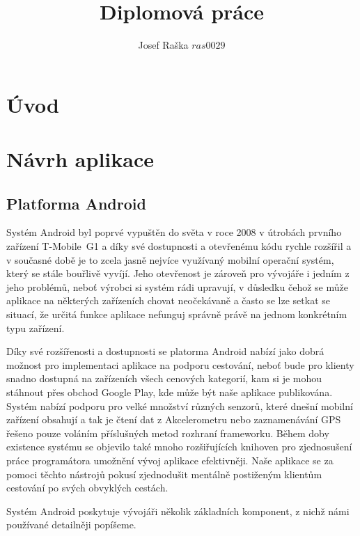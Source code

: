 \documentclass{article}
\title{Diplomová práce}
\author{Josef Raška \(ras0029\)}
\begin{document}
{}

\tableofcontents
\listoffigures
\listoftables

\newpage

\section{Úvod}

\section{Návrh aplikace}
\subsection{Platforma Android}
Systém Android byl poprvé vypuštěn do světa v roce 2008 v útrobách prvního zařízení T-Mobile~G1\cite{androidcentral}
a díky své dostupnosti a otevřenému kódu rychle rozšířil a v současné době je to zcela jasně nejvíce využívaný mobilní
operační systém, který se stále bouřlivě vyvíjí. Jeho otevřenost je zároveň pro vývojáře i jedním z jeho problémů,
neboť výrobci si systém rádi upravují, v důsledku čehož se může aplikace na některých zařízeních chovat
neočekávaně a často se lze setkat se situací, že určitá funkce aplikace nefunguj správně právě na
jednom konkrétním typu zařízení.

Díky své rozšířenosti a dostupnosti se platorma Android nabízí jako dobrá možnost pro implementaci
aplikace na podporu cestování, neboť bude pro klienty snadno dostupná na zařízeních všech cenových
kategorií, kam si je mohou stáhnout přes obchod Google Play, kde může být naše aplikace publikována.
Systém nabízí podporu pro velké množství různých senzorů, které dnešní mobilní zařízení obsahují
a tak je čtení dat z Akcelerometru nebo zaznamenávání GPS řešeno pouze voláním příslušných metod
rozhraní frameworku. Během doby existence systému se objevilo také mnoho rozšiřujících knihoven
pro zjednosušení práce programátora umožnění vývoj aplikace efektivněji. Naše aplikace se
za pomoci těchto nástrojů pokusí zjednodušit mentálně postiženým klientům cestování po svých
obvyklých cestách.

Systém Android poskytuje vývojáři několik základních komponent, z nichž námi používané detailněji popíšeme.
\end{document}
